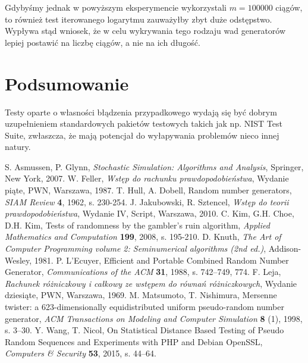 \documentclass[a4paper,11pt,twoside]{book}
\theoremstyle{definition}
\begin{document}
Gdybyśmy jednak w powyższym eksperymencie wykorzystali $m = 100000$ ciągów, to również test iterowanego logarytmu zauważyłby zbyt duże odstępstwo. Wypływa stąd wniosek, że w celu wykrywania tego rodzaju wad generatorów lepiej postawić na liczbę ciągów, a nie na ich długość.

\FloatBarrier
\section{Podsumowanie}
Testy oparte o własności błądzenia przypadkowego wydają się być dobrym uzupełnieniem standardowych pakietów testowych takich jak np. NIST Test Suite, zwłaszcza, że mają potencjał do wyłapywania problemów nieco innej natury.

\begin{thebibliography}{99}
    S. Asmussen, P. Glynn, \emph{Stochastic Simulation: Algorithms and Analysis}, Springer, New York, 2007.
    W. Feller, \emph{Wstęp do rachunku prawdopodobieństwa}, Wydanie piąte, PWN, Warszawa, 1987.
    T. Hull, A. Dobell, Random number generators, \emph{SIAM Review} \textbf{4}, 1962, s. 230-254.
    J. Jakubowski, R. Sztencel, \emph{Wstęp do teorii prawdopodobieństwa}, Wydanie IV, Script, Warszawa, 2010.
    C. Kim, G.H. Choe, D.H. Kim, Tests of randomness by the gambler's ruin algorithm,  \emph{Applied Mathematics and Computation} \textbf{199}, 2008, s. 195-210.
    D. Knuth, \emph{The Art of Computer Programming volume 2: Seminumerical algorithms (2nd ed.)}, Addison-Wesley, 1981.
    P. L'Ecuyer, Efficient and Portable Combined Random Number Generator, \emph{Communications of the ACM} \textbf{31}, 1988, s. 742–749, 774.
    F. Leja, \emph{Rachunek różniczkowy i całkowy ze wstępem do równań różniczkowych}, Wydanie dziesiąte, PWN, Warszawa, 1969.
    M. Matsumoto, T. Nishimura, Mersenne twister: a 623-dimensionally equidistributed uniform pseudo-random number generator, \emph{ACM Transactions on Modeling and Computer Simulation} \textbf{8} (1), 1998, s. 3–30.
    Y. Wang, T. Nicol, On Statistical Distance Based Testing of Pseudo Random Sequences and Experiments with PHP and Debian OpenSSL, \emph{Computers \& Security} \textbf{53}, 2015, s. 44--64.

\end{thebibliography}
\end{document}
